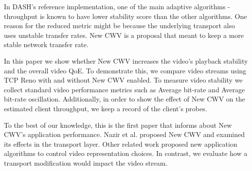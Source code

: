 \documentclass[10pt,sigconf]{acmart}
\begin{document}
In DASH's reference implementation, one of the main adaptive algorithms - throughput is known to have lower stability score than the other algorithms. One  reason for the reduced metric might be because the underlying transport also uses unstable transfer rates. New CWV is a proposal that meant to keep a more stable network transfer rate.


In this paper we show whether New CWV increases the video's playback stability and the overall video QoE. To demonstrate this, we compare video streams using TCP Reno with and without New CWV enabled. To measure video stability we collect standard video performance metrics such as Average bit-rate and Average bit-rate oscillation. Additionally, in order to show the effect of New CWV on the estimated client throughput, we keep a record of the client's probes.



To the best of our knowledge, this is the first paper that informs about New CWV's application performance. Nazir et al. \cite{Nazir-2014-performance-evaluation-congestion-window-validation-dash-newcwv} proposed New CWV and examined its effects in the transport layer. Other related work proposed new application algorithms to control video representation choices. In contrast, we evaluate how a transport modification would impact the video stream.

\end{document}
